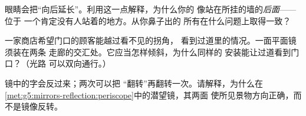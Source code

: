 \begin{exercise}[$\star\star$]\label{exo:g5:mirrors-reflection:9}
眼睛会把“向后延长”。利用这一点解释，为什么你的
像站在所挂的墙的\emph{后面}——位于
一个肯定没有人站着的地方。从你鼻子出的
所有在什么问题上取得一致？
\end{exercise}

\begin{exercise}[$\star\star$]\label{exo:g5:mirrors-reflection:10}
一家商店希望门口的顾客能越过看不见的拐角，
看到过道里的情况。一面平面镜须装在两条
走廊的交汇处。它应当怎样倾斜，为什么同样的
安装能让过道看到门口？（光路
可以双向通行。）
\end{exercise}

\begin{exercise}[$\star\star$]\label{exo:g5:mirrors-reflection:11}
镜中的字会反过来；两次可以把
“翻转”再翻转一次。请解释，为什么在
\cref{met:g5:mirrors-reflection:periscope}中的潜望镜，其两面
使所见景物方向正确，而不是镜像反转。
\end{exercise}
